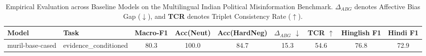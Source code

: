 \begin{table}[t]
\centering
\small
\caption{Empirical Evaluation across Baseline Models on the Multilingual Indian Political Misinformation Benchmark. \textbf{$\Delta_{ABG}$} denotes Affective Bias Gap ($\downarrow$), and \textbf{TCR} denotes Triplet Consistency Rate ($\uparrow$).}
\label{tab:main_results}
\begin{tabular}{llccccccc}
\toprule
\textbf{Model} & \textbf{Task} & \textbf{Macro-F1} & \textbf{Acc(Neut)} & \textbf{Acc(HardNeg)} & \textbf{$\Delta_{ABG}$ $\downarrow$} & \textbf{TCR $\uparrow$} & \textbf{Hinglish F1} & \textbf{Hindi F1} \\
\midrule
muril-base-cased & evidence_conditioned & 80.3 & 100.0 & 84.7 & 15.3 & 54.6 & 76.8 & 72.9 \\
\bottomrule
\end{tabular}
\end{table}